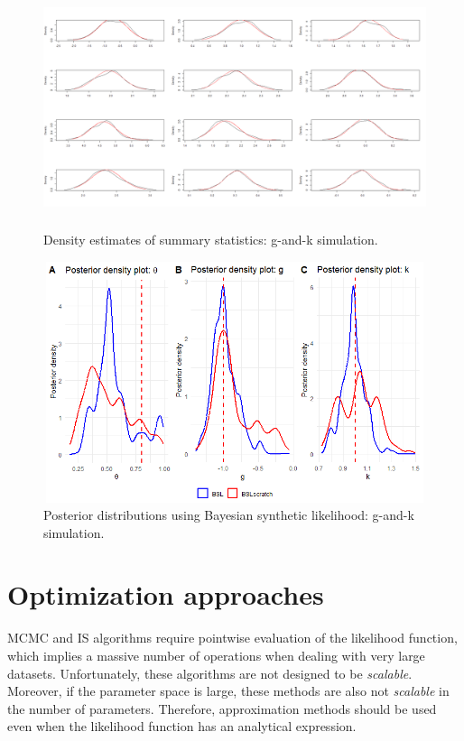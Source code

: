 \begin{figure}[!h]
	\includegraphics[width=340pt, height=200pt]{Chapters/chapter15/figures/DensitiesSum.png}
	\caption[List of figure caption goes here]{Density estimates of summary statistics: g-and-k simulation.}\label{figDensSum}
\end{figure} 

\begin{figure}[!h]
	\includegraphics[width=340pt, height=200pt]{Chapters/chapter15/figures/BSLgksim.png}
	\caption[List of figure caption goes here]{Posterior distributions using Bayesian synthetic likelihood: g-and-k simulation.}\label{figBSL}
\end{figure}


\section{Optimization approaches}\label{sec15_2}

MCMC and IS algorithms require pointwise evaluation of the likelihood function, which implies a massive number of operations when dealing with very large datasets. Unfortunately, these algorithms are not designed to be \textit{scalable}. Moreover, if the parameter space is large, these methods are also not \textit{scalable} in the number of parameters. Therefore, approximation methods should be used even when the likelihood function has an analytical expression.

